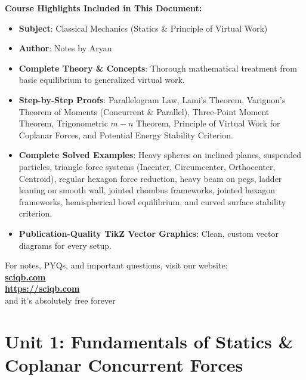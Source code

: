 \documentclass[11pt,a4paper]{article}
\begin{document}
\begin{titlepage}
    \begin{tcolorbox}[colback=accent!20,colframe=primary,arc=6pt,width=0.88\textwidth,halign=left]
    \textbf{\color{primary} Course Highlights Included in This Document:}
    \begin{itemize}[leftmargin=1.5em]
        \item \textbf{Subject}: Classical Mechanics (Statics \& Principle of Virtual Work)
        \item \textbf{Author}: Notes by Aryan
        \item \textbf{Complete Theory \& Concepts}: Thorough mathematical treatment from basic equilibrium to generalized virtual work.
        \item \textbf{Step-by-Step Proofs}: Parallelogram Law, Lami's Theorem, Varignon's Theorem of Moments (Concurrent \& Parallel), Three-Point Moment Theorem, Trigonometric $m-n$ Theorem, Principle of Virtual Work for Coplanar Forces, and Potential Energy Stability Criterion.
        \item \textbf{Complete Solved Examples}: Heavy spheres on inclined planes, suspended particles, triangle force systems (Incenter, Circumcenter, Orthocenter, Centroid), regular hexagon force reduction, heavy beam on pegs, ladder leaning on smooth wall, jointed rhombus frameworks, jointed hexagon frameworks, hemispherical bowl equilibrium, and curved surface stability criterion.
        \item \textbf{Publication-Quality TikZ Vector Graphics}: Clean, custom vector diagrams for every setup.
    \end{itemize}
    \end{tcolorbox}
    \vfill
    {\large\sffamily For notes, PYQs, and important questions, visit our website:}\\[0.3cm]
    {\Huge\bfseries\color{primary} \href{https://sciqb.com}{sciqb.com}}\\[0.2cm]
    {\large\bfseries\color{secondary} \url{https://sciqb.com}}\\[0.2cm]
    {\large\sffamily and it's absolutely free forever}\\
    \vspace*{0.5cm}
\end{titlepage}

\newpage
\tableofcontents
\newpage

\section{Unit 1: Fundamentals of Statics \& Coplanar Concurrent Forces}
\end{document}
